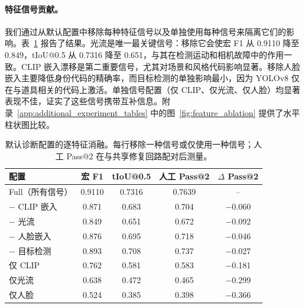 \documentclass{article}
\newcommand{\FeatFullMacroF}{0.9110}
\newcommand{\FeatFullTIoU}{0.7316}
\newcommand{\FeatNoCLIPMacroF}{0.871}
\newcommand{\FeatNoCLIPTIoU}{0.683}
\newcommand{\FeatNoFlowMacroF}{0.849}
\newcommand{\FeatNoFlowTIoU}{0.651}
\newcommand{\FeatNoFaceMacroF}{0.876}
\newcommand{\FeatNoFaceTIoU}{0.695}
\newcommand{\FeatNoObjMacroF}{0.893}
\newcommand{\FeatNoObjTIoU}{0.708}
\newcommand{\FeatCLIPOnlyMacroF}{0.762}
\newcommand{\FeatCLIPOnlyTIoU}{0.581}
\newcommand{\FeatFlowOnlyMacroF}{0.638}
\newcommand{\FeatFlowOnlyTIoU}{0.472}
\newcommand{\FeatFaceOnlyMacroF}{0.524}
\newcommand{\FeatFaceOnlyTIoU}{0.385}
\newcommand{\FeatFullHumanPassTwo}{0.7639}
\newcommand{\FeatNoCLIPHumanPassTwo}{0.704}
\newcommand{\FeatNoFlowHumanPassTwo}{0.672}
\newcommand{\FeatNoFaceHumanPassTwo}{0.718}
\newcommand{\FeatNoObjHumanPassTwo}{0.737}
\newcommand{\FeatCLIPOnlyHumanPassTwo}{0.583}
\newcommand{\FeatFlowOnlyHumanPassTwo}{0.465}
\newcommand{\FeatFaceOnlyHumanPassTwo}{0.398}
\begin{document}
\paragraph{特征信号贡献。}
我们通过从默认配置中移除每种特征信号以及单独使用每种信号来隔离它们的影响。表~\ref{tab:feature_ablation} 报告了结果。光流是唯一最关键信号：移除它会使宏 F1 从 \FeatFullMacroF{} 降至 \FeatNoFlowMacroF，tIoU@0.5 从 \FeatFullTIoU{} 降至 \FeatNoFlowTIoU，与其在检测运动和相机故障中的作用一致。CLIP 嵌入漂移是第二重要信号，尤其对场景和风格代码影响显著。移除人脸嵌入主要降低身份代码的精确率，而目标检测的单独影响最小，因为 YOLOv8 仅在与道具相关的代码上激活。单独信号配置（仅 CLIP、仅光流、仅人脸）均显著表现不佳，证实了这些信号携带互补信息。附录~\ref{app:additional_experiment_tables} 中的图~\ref{fig:feature_ablation} 提供了水平柱状图比较。

\begin{table}[t]
\centering\scriptsize
\caption{默认诊断配置的逐特征消融。每行移除一种信号或仅使用一种信号；人工 Pass@2 在与共享修复回路配对后测量。}
\label{tab:feature_ablation}
\begin{tabular}{lcccc}
\toprule
配置 & 宏 F1 & tIoU@0.5 & 人工 Pass@2 & $\Delta$ Pass@2 \\
\midrule
Full（所有信号） & \FeatFullMacroF & \FeatFullTIoU & \FeatFullHumanPassTwo & -- \\
$-$ CLIP 嵌入 & \FeatNoCLIPMacroF & \FeatNoCLIPTIoU & \FeatNoCLIPHumanPassTwo & $-$0.060 \\
$-$ 光流 & \FeatNoFlowMacroF & \FeatNoFlowTIoU & \FeatNoFlowHumanPassTwo & $-$0.092 \\
$-$ 人脸嵌入 & \FeatNoFaceMacroF & \FeatNoFaceTIoU & \FeatNoFaceHumanPassTwo & $-$0.046 \\
$-$ 目标检测 & \FeatNoObjMacroF & \FeatNoObjTIoU & \FeatNoObjHumanPassTwo & $-$0.027 \\
仅 CLIP & \FeatCLIPOnlyMacroF & \FeatCLIPOnlyTIoU & \FeatCLIPOnlyHumanPassTwo & $-$0.181 \\
仅光流 & \FeatFlowOnlyMacroF & \FeatFlowOnlyTIoU & \FeatFlowOnlyHumanPassTwo & $-$0.299 \\
仅人脸 & \FeatFaceOnlyMacroF & \FeatFaceOnlyTIoU & \FeatFaceOnlyHumanPassTwo & $-$0.366 \\
\bottomrule
\end{tabular}
\end{table}
\end{document}
